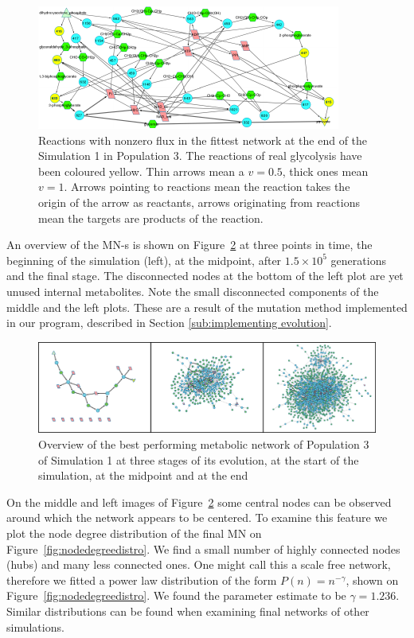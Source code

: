 \documentclass[a4paper,12pt]{article}
\begin{document}
\begin{figure}[htpb]
	\centering
	\includegraphics[width=1\linewidth]{trunk_glyc_final_job1_colored.pdf}
	\caption{Reactions with nonzero flux in the fittest network at the end of the Simulation 1 in Population 3. The reactions of real glycolysis have been coloured yellow. Thin arrows mean a $v=0.5$, thick ones mean $v=1$. Arrows pointing to reactions mean the reaction takes the origin of the arrow as reactants, arrows originating from reactions mean the targets are products of the reaction.}
	\label{fig:trunk_glyc_final_job1}
\end{figure}


An overview of the MN-s is shown on Figure~\ref{fig:init-mid-final} at three points in time, the beginning of the simulation (left), at the midpoint, after $1.5\times 10^5$ generations and the final stage. The disconnected nodes at the bottom of the left plot are yet unused internal metabolites. Note the small disconnected components of the middle and the left plots. These are a result of the mutation method implemented in our program, described in Section \ref{sub:implementing evolution}. 

\begin{figure}[htpb]
	\centering
	\includegraphics[width=1\linewidth]{init-mid-final.png}
	\caption{Overview of the best performing metabolic network of Population 3 of Simulation 1 at three stages of its evolution, at the start of the simulation, at the midpoint and at the end}
	\label{fig:init-mid-final}
\end{figure}

On the middle and left images of Figure~\ref{fig:init-mid-final} some central nodes can be observed around which the network appears to be centered. To examine this feature we plot the node degree distribution of the final MN on Figure~\ref{fig:nodedegreedistro}. We find a small number of highly connected nodes (hubs) and many less connected ones. One might call this a scale free network, therefore we fitted a power law distribution of the form $P(n)=n^{-\gamma}$, shown on Figure~\ref{fig:nodedegreedistro}. We found the parameter estimate to be $\gamma=1.236$. Similar distributions can be found when examining final networks of other simulations. 
\end{document}
